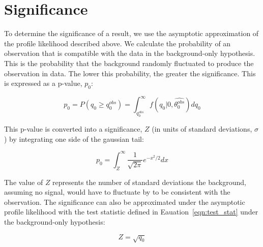 \section{Significance}
To determine the significance of a result, we use the asymptotic approximation of the profile likelihood described above. We calculate the probability of an observation that is compatible with the
data in the background-only hypothesis. This is the probability that the background randomly fluctuated to produce the observation in data. The lower this probability, the greater the significance.
This is expressed as a p-value, $p_{0}$:

\begin{equation}
\label{eqn:signif1}
p_{0} = P(q_{0} \geq q_{0}^{obs}) = \int_{q_{0}^{obs}}^{\infty} f(q_{0}|0,\hat{\theta_{0}^{obs}}) dq_{0}
\end{equation}

\noindent This p-value is converted into a significance, $Z$ (in units of standard deviations, $\sigma$) by integrating one side of the gaussian tail:

\begin{equation}
\label{eqn:signif2}
p_{0} = \int_{Z}^{\infty} \frac{1}{\sqrt{2\pi}}e^{-x^{2}/2} dx
\end{equation}

\noindent The value of $Z$ represents the number of standard deviations the background, assuming no signal, would have to fluctuate by to be consistent with the observation. 
The significance can also be approximated under the asymptotic profile likelihood with the test statistic defined in Eauation~\ref{eqn:test_stat} under the background-only hypothesis:

\begin{equation}
\label{eqn:signif3}
Z = \sqrt{q_{0}}
\end{equation}
